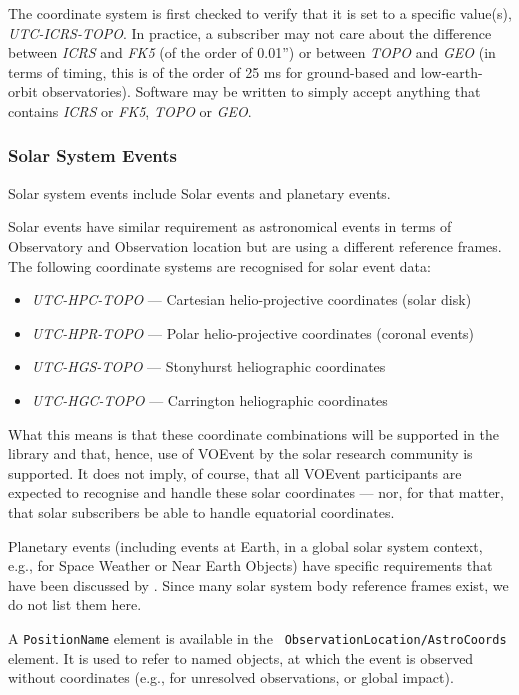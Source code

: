 \documentclass[11pt,a4paper]{ivoa}
\begin{document}
The coordinate system is first checked to verify that it is set to a specific
value(s), \emph{UTC-ICRS-TOPO}. In practice, a subscriber may not care about the
difference between \emph{ICRS} and \emph{FK5} (of the order of 0.01'') or
between \emph{TOPO} and \emph{GEO} (in terms of timing, this is of the order of
25 ms for ground-based and low-earth-orbit observatories). Software may be
written to simply accept anything that contains \emph{ICRS} or \emph{FK5},
\emph{TOPO} or \emph{GEO}.


\subsubsection{Solar System Events}
\label{sec:3.4.4}
Solar system events include Solar events and planetary events.

Solar events have similar requirement as astronomical events in terms of
Observatory and Observation location but are using a different reference frames.
The following coordinate systems are recognised for solar event data:
\begin{itemize}
\item \emph{UTC-HPC-TOPO} --- Cartesian helio-projective coordinates (solar disk)
\item \emph{UTC-HPR-TOPO} --- Polar helio-projective coordinates (coronal events)
\item \emph{UTC-HGS-TOPO} --- Stonyhurst heliographic coordinates
\item \emph{UTC-HGC-TOPO} --- Carrington heliographic coordinates
\end{itemize}

What this means is that these coordinate combinations will be supported in the
library and that, hence, use of VOEvent by the solar research community is
supported. It does not imply, of course, that all VOEvent participants are
expected to recognise and handle these solar coordinates --- nor, for that
matter, that solar subscribers be able to handle equatorial coordinates.

Planetary events (including events at Earth, in a global solar system context,
e.g., for Space Weather or Near Earth Objects) have specific requirements that 
have been discussed by \citet{2018arXiv181112680C}. Since many solar system body 
reference frames exist, we do not list them here. 

A \texttt{PositionName} element is available in the \texttt{
ObservationLocation/AstroCoords} element. It is used to refer to named objects, 
at which the event is observed without coordinates (e.g., for unresolved 
observations, or global impact).  
\end{document}
